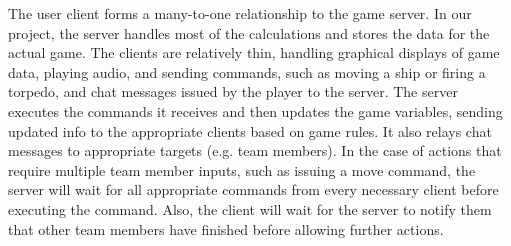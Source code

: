 The user client forms a many-to-one relationship to the game server. In our project, the server handles most of the calculations and stores the data for the actual game. The clients are relatively thin, handling graphical displays of game data, playing audio, and sending commands, such as moving a ship or firing a torpedo, and chat messages issued by the player to the server. The server executes the commands it receives and then updates the game variables, sending updated info to the appropriate clients based on game rules. It also relays chat messages to appropriate targets (e.g. team members). In the case of  actions that require multiple team member inputs, such as issuing a move command, the server will wait for all appropriate commands from every necessary client before executing the command. Also, the client will wait for the server to notify them that other team members have finished before allowing further actions.
